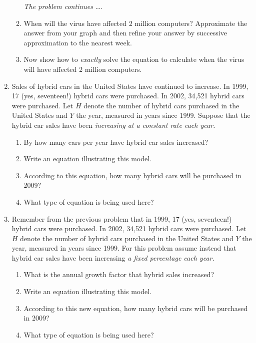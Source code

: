 \documentclass[12pt]{article}
\begin{document}
\begin{enumerate}
\begin{enumerate}
\newpage
\hspace{-.5 in}\emph{The problem continues \ldots.}

\item When will the virus have affected 2 million computers?  Approximate the answer from your graph and then refine your answer by successive approximation to the nearest week.
\vfill
\item Now show how to \textit{exactly} solve the equation to calculate when the virus will have affected 2 million computers.
\vfill
\end{enumerate}




\newpage
\item Sales of hybrid cars in the United States have continued to increase.  In 1999, 17 (yes, seventeen!) hybrid cars were purchased.  In 2002, 34,521 hybrid cars were purchased. Let $H$ denote the number of hybrid cars purchased in the United States and $Y$ the year, measured in years since 1999.  Suppose that the hybrid car sales have been \textit{increasing at a constant rate each year.}

\begin{enumerate}
\item By how many cars per year have hybrid car sales increased?
\vfill
\item Write an equation illustrating this model.
\vfill
\item According to this equation, how many hybrid cars will be purchased in 2009?
\vfill
\item What type of equation is being used here?
\vfill
\end{enumerate}

\newpage
\item  Remember from the previous problem that in 1999, 17 (yes, seventeen!) hybrid cars were purchased.  In 2002, 34,521 hybrid cars were purchased. Let $H$ denote the number of hybrid cars purchased in the United States and $Y$ the year, measured in years since 1999.  For this problem assume instead that hybrid car sales have been increasing \textit{a fixed percentage each year.}

\begin{enumerate}
\item What is the annual growth factor that hybrid sales increased?  
\vfill
\item Write an equation illustrating this model.
\vfill
\item According to this new equation, how many hybrid cars will be purchased in 2009?
\vfill
\item What type of equation is being used here?
\vfill
\end{enumerate}









\end{enumerate}
\end{document}
